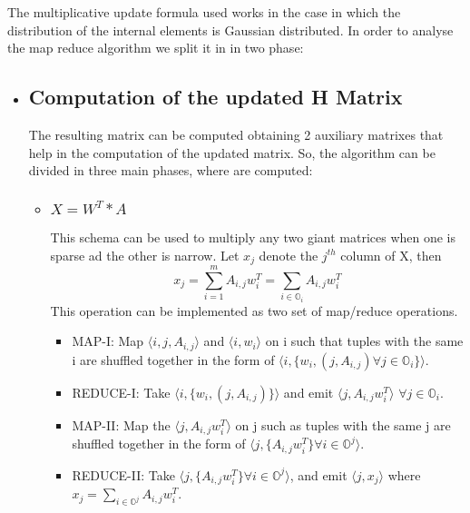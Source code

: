 \documentclass[a4paper,12pt]{article}
\begin{document}
The multiplicative update formula used works in the case in which the distribution of the internal elements is Gaussian
distributed. 
In order to analyse the map reduce algorithm we split it in in two
phase:
\begin{itemize}
  \item \subsection{Computation of the updated H Matrix}
    The resulting matrix can be computed obtaining 2 auxiliary
    matrixes that help in the computation of the updated matrix. So,
    the algorithm can be divided in three main phases, where are
    computed:
    \begin{itemize}
      \item \subsubsection{$ X = W^T * A $}
        This schema can be used to multiply any two giant matrices when one
        is sparse ad the other is narrow. Let $x_j$ denote the $j^{th}$ column of X, then 
        $$ x_j = \sum_{i=1}^{m} A_{i,j} w_{i}^{T} = \sum_{i \in \mathbb{O}_i} A_{i,j} w_{i}^{T} $$ 
        This operation can be implemented as two set of map/reduce
        operations.
        \begin{itemize}
          \item MAP-I: Map $ \langle i, j, A_{i,j} \rangle $ and $\langle i, w_i \rangle$ on i
            such that tuples with the same i are shuffled together in
            the form of  $ \langle i, \{w_{i}, (j, A_{i,j}) \forall j
            \in \mathbb{O}_i \} \rangle$.

         \item REDUCE-I: Take  $ \langle i, \{w_{i}, (j, A_{i,j}) \}
           \rangle$ and emit  $ \langle j, A_{i,j}  w_{i}^{T}
           \rangle$ $\forall j \in \mathbb{O}_i $.

          \item MAP-II: Map the $ \langle j, A_{i,j}  w_{i}^{T}
           \rangle$ on j such as tuples with the same j are shuffled
           together in the form of $ \langle j, \{A_{i,j}  w_{i}^{T} \}
           \forall i \in \mathbb{O}^j \rangle$.

          \item REDUCE-II: Take $ \langle j, \{A_{i,j}  w_{i}^{T} \}
           \forall i \in \mathbb{O}^j \rangle$, and emit $\langle j,
           x_j \rangle$ where $ x_j = \sum_{i \in \mathbb{O}^j} A_{i,j}  w_{i}^{T} $.


\end{itemize}
\end{itemize}
\end{itemize}
\end{document}
